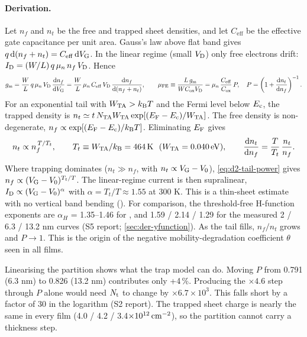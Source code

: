\paragraph{Derivation.}
\begin{derivation}
Let $n_f$ and $n_t$ be the free and trapped sheet densities, and let $C_{\mathrm{eff}}$ be the effective gate capacitance per unit area. Gauss's law above flat band gives $q\,\mathrm{d}(n_f+n_t) = C_{\mathrm{eff}}\,\mathrm{d}V_{\mathrm{G}}$. In the linear regime (small $V_{\mathrm{D}}$) only free electrons drift: $I_{\mathrm{D}} = (W/L)\,q\,\mu_n\,n_f\,V_{\mathrm{D}}$. Hence
\begin{equation}
  g_{\mathrm{m}} = \frac{W}{L}\,q\,\mu_n\,V_{\mathrm{D}}\,\frac{\mathrm{d}n_f}{\mathrm{d}V_{\mathrm{G}}}
      = \frac{W}{L}\,\mu_n\,C_{\mathrm{eff}}\,V_{\mathrm{D}}\,\frac{\mathrm{d}n_f}{\mathrm{d}(n_f+n_t)},
  \qquad
  \mu_{\mathrm{FE}} \equiv \frac{L\,g_{\mathrm{m}}}{WC_{\mathrm{ox}}V_{\mathrm{D}}} = \mu_n\,\frac{C_{\mathrm{eff}}}{C_{\mathrm{ox}}}\,P,
  \quad P=\left(1+\frac{\mathrm{d}n_t}{\mathrm{d}n_f}\right)^{-1}.
  \label{eq:d2-partition}
\end{equation}
For an exponential tail with $W_{\mathrm{TA}} > k_{\mathrm{B}}T$ and the Fermi level below $E_{\mathrm{c}}$, the trapped density is $n_t\simeq t\,N_{\mathrm{TA}}W_{\mathrm{TA}}\exp[(E_{\mathrm{F}}-E_{\mathrm{c}})/W_{\mathrm{TA}}]$. The free density is non-degenerate, $n_f\propto\exp[(E_{\mathrm{F}}-E_{\mathrm{c}})/k_{\mathrm{B}}T]$. Eliminating $E_{\mathrm{F}}$ gives
\begin{equation}
  n_t \propto n_f^{\,T/T_t},\qquad T_t\equiv W_{\mathrm{TA}}/k_{\mathrm{B}} = \SI{464}{K}\ \ (W_{\mathrm{TA}}=\SI{0.040}{eV}),
  \qquad \frac{\mathrm{d}n_t}{\mathrm{d}n_f} = \frac{T}{T_t}\,\frac{n_t}{n_f}.
  \label{eq:d2-tail-power}
\end{equation}
Where trapping dominates ($n_t\gg n_f$, with $n_t\propto V_{\mathrm{G}}-V_0$), \cref{eq:d2-tail-power} gives $n_f\propto(V_{\mathrm{G}}-V_0)^{T_t/T}$. The linear-regime current is then supralinear, $I_{\mathrm{D}}\propto(V_{\mathrm{G}}-V_0)^{\alpha}$ with $\alpha=T_t/T\approx1.55$ at 300 K. This is a thin-sheet estimate with no vertical band bending (\evTHEORY). For comparison, the threshold-free H-function exponents are $\alpha_H$ = 1.35--1.46 for , and 1.59 / 2.14 / 1.29 for the measured 2 / 6.3 / 13.2 nm curves (S5 report; \cref{sec:der-yfunction}). As the tail fills, $n_f/n_t$ grows and $P\rightarrow1$. This is the origin of the negative mobility-degradation coefficient $\theta$ seen in all films.
\end{derivation}

Linearising the partition shows what the trap model can do. Moving $P$ from 0.791 (6.3 nm) to 0.826 (13.2 nm) contributes only +4\,\%. Producing the $\times4.6$ step through $P$ alone would need $N_{\mathrm{t}}$ to change by $\times6.7\times10^{3}$. This falls short by a factor of 30 in the logarithm (S2 report). The trapped sheet charge is nearly the same in every film (4.0 / 4.2 / 3.4$\times10^{12}\,\mathrm{cm}^{-2}$), so the partition cannot carry a thickness step.


